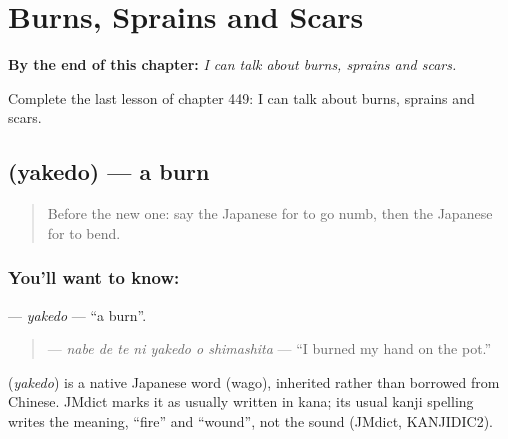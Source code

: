 
\chapter{Burns, Sprains and Scars}
\label{ch:ja-burns-sprains-and-scars}

\begin{chapteropening}
\textbf{By the end of this chapter:} \emph{I can talk about burns, sprains and scars.}

Complete the last lesson of chapter 449: I can talk about burns, sprains and scars.
\end{chapteropening}

\section[\texorpdfstring{\ja{やけど} (yakedo)}{やけど (yakedo)}]{ (yakedo) — a burn}

\label{lesson:JA-C449-yakedo}



\begin{quote}
Before the new one: say the Japanese for to go numb, then the Japanese for to bend.
\end{quote}

\subsection*{You'll want to know: }
\textbf{} — \emph{yakedo} — \textquotedblleft{}a burn\textquotedblright{}.

\begin{quote}
\textbf{   } — \emph{nabe de te ni yakedo o shimashita} — \textquotedblleft{}I burned my hand on the pot.\textquotedblright{}
\end{quote}

\begin{cousinweb}
\textbf{} (\emph{yakedo}) is a native Japanese word (wago), inherited rather than borrowed from Chinese. JMdict marks it as usually written in kana; its usual kanji spelling writes the meaning, \textquotedblleft{}fire\textquotedblright{} and \textquotedblleft{}wound\textquotedblright{}, not the sound (JMdict, KANJIDIC2).
\end{cousinweb}

